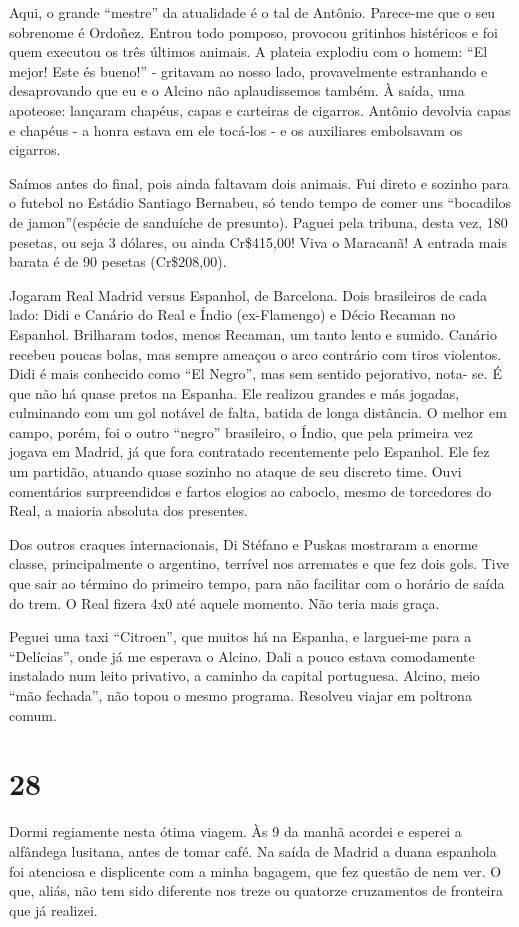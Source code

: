 Aqui, o grande “mestre” da atualidade é o tal de Antônio. Parece-me que o seu sobrenome é Ordoñez. Entrou todo pomposo, provocou gritinhos histéricos e foi quem executou os três últimos animais. A plateia explodiu com o homem: “El mejor! Este és bueno!” - gritavam ao nosso lado, provavelmente estranhando e desaprovando que eu e o Alcino não aplaudissemos também. À saída, uma apoteose: lançaram chapéus, capas e carteiras de cigarros. Antônio devolvia capas e chapéus - a honra estava em ele tocá-los - e os auxiliares embolsavam os cigarros.

Saímos antes do final, pois ainda faltavam dois animais. Fui direto e sozinho para o futebol no Estádio Santiago Bernabeu, só tendo tempo de comer uns “bocadilos de jamon”(espécie de sanduíche de presunto). Paguei pela tribuna, desta vez, 180 pesetas, ou seja 3 dólares, ou ainda Cr\$415,00! Viva o Maracanã! A entrada mais barata é de 90 pesetas (Cr\$208,00).

Jogaram Real Madrid versus Espanhol, de Barcelona. Dois brasileiros de cada lado: Didi e Canário do Real e Índio (ex-Flamengo) e Décio Recaman no Espanhol. Brilharam todos, menos Recaman, um tanto lento e sumido. Canário recebeu poucas bolas, mas sempre ameaçou o arco contrário com tiros violentos. Didi é mais conhecido como “El Negro”, mas sem sentido pejorativo, nota- se. É que não há quase pretos na Espanha. Ele realizou grandes e más jogadas, culminando com um gol notável de falta, batida de longa distância. O melhor em campo, porém, foi o outro “negro” brasileiro, o Índio, que pela primeira vez jogava em Madrid, já que fora contratado recentemente pelo Espanhol. Ele fez um partidão, atuando quase sozinho no ataque de seu discreto time. Ouvi comentários surpreendidos e fartos elogios ao caboclo, mesmo de torcedores do Real, a maioria absoluta dos presentes.

Dos outros craques internacionais, Di Stéfano e Puskas mostraram a enorme classe, principalmente o argentino, terrível nos arremates e que fez dois gols. Tive que sair ao término do primeiro tempo, para não facilitar com o horário de saída do trem. O Real fizera 4x0 até aquele momento. Não teria mais graça.

Peguei uma taxi “Citroen”, que muitos há na Espanha, e larguei-me para a “Delícias”, onde já me esperava o Alcino. Dali a pouco estava comodamente instalado num leito privativo, a caminho da capital portuguesa. Alcino, meio “mão fechada”, não topou o mesmo programa. Resolveu viajar em poltrona comum.

\section*{28 \adfflatleafright {}}
Dormi regiamente nesta ótima viagem. Às 9 da manhã acordei e esperei a alfândega lusitana, antes de tomar café. Na saída de Madrid a duana espanhola foi atenciosa e displicente com a minha bagagem, que fez questão de nem ver. O que, aliás, não tem sido diferente nos treze ou quatorze cruzamentos de fronteira que já realizei.

